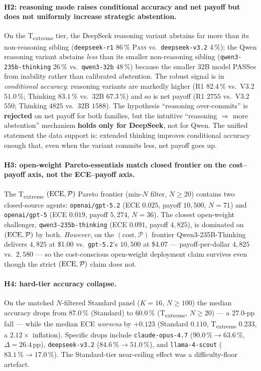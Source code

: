 \paragraph{H2: reasoning mode raises conditional accuracy and net payoff
but does not uniformly increase strategic abstention.}
On the T\textsubscript{extreme} tier, the DeepSeek reasoning variant
abstains far more than its non-reasoning sibling
(\texttt{deepseek-r1} 86\,\% \textsc{Pass} vs.\ \texttt{deepseek-v3.2}
4\,\%); the Qwen reasoning variant abstains \emph{less} than its smaller
non-reasoning sibling (\texttt{qwen3-235b-thinking} 26\,\% vs.\
\texttt{qwen3-32b} 48\,\%) because the smaller 32B model PASSes from
inability rather than calibrated abstention. The robust signal is in
\emph{conditional accuracy}: reasoning variants are markedly higher
(R1 $82.4\,\%$ vs.\ V3.2 $51.0\,\%$;
Thinking $83.1\,\%$ vs.\ 32B $67.3\,\%$) and so is net payoff
(R1 $2755$ vs.\ V3.2 $550$; Thinking $4825$ vs.\ 32B $1588$). The
hypothesis ``reasoning over-commits'' is \textbf{rejected} on net
payoff for both families, but the intuitive ``reasoning $\Rightarrow$
more abstention'' mechanism \textbf{holds only for DeepSeek}, not for
Qwen. The unified statement the data support is: extended thinking
improves conditional accuracy enough that, even when the variant
commits less, net payoff goes up.

\paragraph{H3: open-weight Pareto-essentials match closed frontier on
the cost--payoff axis, not the ECE--payoff axis.}
The T\textsubscript{extreme} $(\mathrm{ECE}, \mathcal{P})$ Pareto frontier
(min-$N$ filter, $N \ge 20$) contains two closed-source agents:
\texttt{openai/gpt-5.2} (ECE $0.025$, payoff $10{,}500$, $N=71$) and
\texttt{openai/gpt-5} (ECE $0.019$, payoff $5{,}274$, $N=36$). The
closest open-weight challenger, \texttt{qwen3-235b-thinking}
(ECE $0.091$, payoff $4{,}825$), is dominated on $(\mathrm{ECE}, \mathcal{P})$
by both. \emph{However}, on the $(\text{cost}, \mathcal{P})$ frontier
Qwen3-235B-Thinking delivers $4{,}825$ at \$1.00 vs.\ \texttt{gpt-5.2}'s
$10{,}500$ at \$4.07 --- payoff-per-dollar $4{,}825$ vs.\ $2{,}580$ ---
so the cost-conscious open-weight deployment claim survives even though
the strict $(\mathrm{ECE}, \mathcal{P})$ claim does not.

\paragraph{H4: hard-tier accuracy collapse.}
On the matched $N$-filtered Standard panel ($K = 16$, $N \ge 100$) the
median accuracy drops from $87.0\,\%$ (Standard) to $60.0\,\%$
(T\textsubscript{extreme}, $N \ge 20$) --- a $27.0$-pp fall --- while
the median ECE \emph{worsens} by $+0.123$ (Standard $0.110$,
T\textsubscript{extreme} $0.233$, a $2.12\times$ inflation). Specific
drops include \texttt{claude-opus-4.7}
($90.0\,\% \!\to\! 63.6\,\%$, $\Delta = 26.4$\,pp),
\texttt{deepseek-v3.2} ($84.6\,\% \!\to\! 51.0\,\%$), and
\texttt{llama-4-scout} ($83.1\,\% \!\to\! 17.0\,\%$). The Standard-tier
near-ceiling effect was a difficulty-floor artefact.

